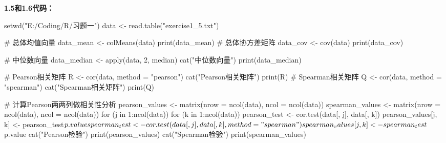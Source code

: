 \documentclass[12pt, a4paper, oneside]{ctexart}
\begin{document}
\textbf{1.5和1.6代码：}
\begin{rcode}
setwd("E:/Coding/R/习题一")
data <- read.table("exercise1_5.txt")

# 总体均值向量
data_mean <- colMeans(data)
print(data_mean)
# 总体协方差矩阵
data_cov <- cov(data)
print(data_cov)

# 中位数向量
data_median <- apply(data, 2, median)
cat("中位数向量\n")
print(data_median)

# Pearson相关矩阵
R <- cor(data, method = "pearson")
cat("Pearson相关矩阵\n")
print(R)
# Spearman相关矩阵
Q <- cor(data, method = "spearman")
cat("Spearman相关矩阵\n")
print(Q)

# 计算Pearson两两列做相关性分析
pearson_values <- matrix(nrow = ncol(data), ncol = ncol(data))
spearman_values <- matrix(nrow = ncol(data), ncol = ncol(data))
for (j in 1:ncol(data)) {
    for (k in 1:ncol(data)) {
        pearson_test <- cor.test(data[, j], data[, k])
        pearson_values[j, k] <- pearson_test$p.value
        spearman_test <- cor.test(data[, j], data[, k], method = "spearman")
        spearman_values[j, k] <- spearman_test$p.value
    }
}
cat("Pearson检验\n")
print(pearson_values)
cat("Spearman检验\n")
print(spearman_values)
\end{rcode}
\end{document}

